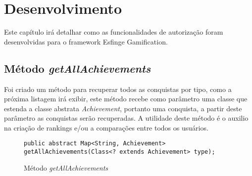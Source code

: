 \newpage
\chapter{Desenvolvimento}
\label{ch:desenvolvimento}

\par Este capítulo irá detalhar como as funcionalidades de autorização foram desenvolvidas para o framework Esfinge Gamification.

\section{Método \textit{getAllAchievements}}
\par Foi criado um método para recuperar todos as conquistas por tipo, como a próxima listagem irá exibir, este método recebe como parâmetro uma classe que estenda a classe abstrata \textit{Achievement}, portanto uma conquista, a partir deste parâmetro as conquistas serão recuperadas. A utilidade deste método é o auxilio na criação de rankings e/ou a comparações entre todos os usuários.

\begin{figure}[H]
    \centering
    \begin{lstlisting}
public abstract Map<String, Achievement> getAllAchievements(Class<? extends Achievement> type);
\end{lstlisting}
    \caption{Método \textit{getAllAchievements}}
    \label{fig:my_label}
\end{figure}


